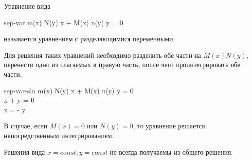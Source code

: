 
\begin{definition}
  Уравнение вида
  \begin{lequation}{sep-var}
    m(x) N(y) \dd x + M(x) n(y) \dd y = 0
  \end{lequation}
  называется уравнением с разделяющимися переменными.
\end{definition}

Для решения таких уравнений необходимо разделить обе части на \(M(x) N(y)\),
перенести одно из слагаемых в правую часть, после чего проинтегрировать обе
части.

\begin{lequation}{sep-var-sln}
  m(x) N(y) \dd x + M(x) n(y) \dd y = 0 \\
   \dd x +  \dd y = 0 \\
  \int {} \dd x = - \int {} \dd y 
\end{lequation}

\begin{remark}
  В случае, если \(M(x) = 0\) или \(N(y) = 0\), то уравнение решается
  непосредственным интегрированием.
\end{remark}

\begin{remark}
  Решения вида \(x = const, y = const\) не всегда получаемы из общего решения.
\end{remark}

